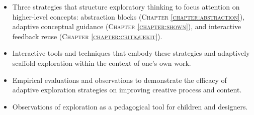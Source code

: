 \begin{itemize}
    \item Three strategies that structure exploratory thinking to focus attention on higher-level concepts: abstraction blocks (\textsc{Chapter \ref{chapter:abstraction}}), adaptive conceptual guidance (\textsc{Chapter \ref{chapter:shown}}), and interactive feedback reuse (\textsc{Chapter \ref{chapter:critiquekit}}).
    \item Interactive tools and techniques that embody these strategies and adaptively scaffold exploration within the context of one’s own work.
    \item Empirical evaluations and observations to demonstrate the efficacy of adaptive exploration strategies on improving creative process and content.
    \item Observations of exploration as a pedagogical tool for children and designers.
\end{itemize}
 




